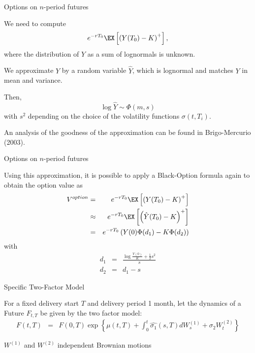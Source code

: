 {Options on $n$-period futures}






	We need to compute
$$e^{-rT_0} \EX \left[\left(Y(T_0)-K\right)^+\right],$$
where the distribution of $Y$ as a sum of lognormals is unknown.


	
We approximate $Y$ by a random variable $\hat{Y}$,
which is lognormal and matches $Y$ in mean and variance.


	
Then,
$$\log \hat{Y} \sim \Phi(m,s)$$
with $s^2$ depending on the choice of the volatility functions
$\sigma(t,T_i)$.


	
An analysis of the goodness of the approximation
can be found in Brigo-Mercurio (2003).





{Options on $n$-period futures}

Using this approximation, it
is possible to apply a Black-Option formula again to obtain the
option value as
\begin{eqnarray}\label{eq:approx-option}
V^{option} & = & e^{-rT_0} \EX \left[\left(Y(T_0)-K\right)^+\right] \nonumber \\
& \approx & e^{-rT_0} \EX \left[\left(\hat{Y}(T_0)-K\right)^+\right]\nonumber \\
& = &  e^{-rT_0} \left(Y(0)\Phi(d_1)-K\Phi(d_2)\right)
\end{eqnarray}
with
\begin{eqnarray*}
d_1& = & \frac{\log \frac{Y(0)}{K}+\frac{1}{2}s^2}{s}\\
d_2 & = & d_1 - s
\end{eqnarray*}

{Specific  Two-Factor Model}







	For a fixed delivery start $T$ and delivery period 1 month, let the dynamics of a Future $F_{t,T}$ be given by the two factor model:
\begin{eqnarray*}
F(t,T)& =&F(0,T)\exp\left\{\mu(t,T)  +\int_0^t\hat{\sigma_1}(s,T)dW_s^{(1)}+\sigma_2W_t^{(2)}\right\}
\end{eqnarray*}



	$W^{(1)}$ and $W^{(2)}$ independent Brownian motions


